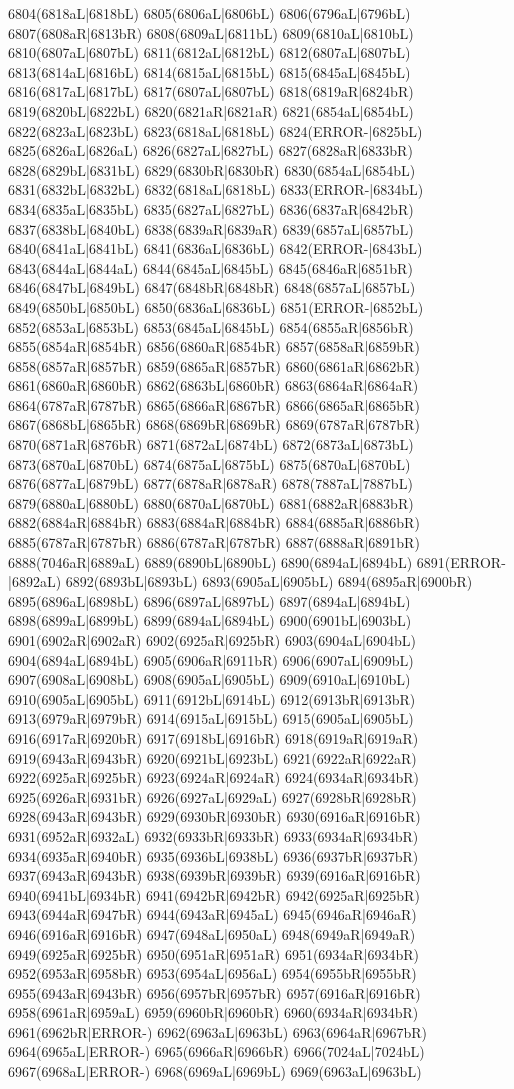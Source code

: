 6804(6818aL|6818bL) 6805(6806aL|6806bL) 6806(6796aL|6796bL) 6807(6808aR|6813bR) 6808(6809aL|6811bL) 6809(6810aL|6810bL) 6810(6807aL|6807bL) 6811(6812aL|6812bL) 6812(6807aL|6807bL) 6813(6814aL|6816bL) 6814(6815aL|6815bL) 6815(6845aL|6845bL) 6816(6817aL|6817bL) 6817(6807aL|6807bL) 6818(6819aR|6824bR) 6819(6820bL|6822bL) 6820(6821aR|6821aR) 6821(6854aL|6854bL) 6822(6823aL|6823bL) 6823(6818aL|6818bL) 6824(ERROR-|6825bL) 6825(6826aL|6826aL) 6826(6827aL|6827bL) 6827(6828aR|6833bR) 6828(6829bL|6831bL) 6829(6830bR|6830bR) 6830(6854aL|6854bL) 6831(6832bL|6832bL) 6832(6818aL|6818bL) 6833(ERROR-|6834bL) 6834(6835aL|6835bL) 6835(6827aL|6827bL) 6836(6837aR|6842bR) 6837(6838bL|6840bL) 6838(6839aR|6839aR) 6839(6857aL|6857bL) 6840(6841aL|6841bL) 6841(6836aL|6836bL) 6842(ERROR-|6843bL) 6843(6844aL|6844aL) 6844(6845aL|6845bL) 6845(6846aR|6851bR) 6846(6847bL|6849bL) 6847(6848bR|6848bR) 6848(6857aL|6857bL) 6849(6850bL|6850bL) 6850(6836aL|6836bL) 6851(ERROR-|6852bL) 6852(6853aL|6853bL) 6853(6845aL|6845bL) 6854(6855aR|6856bR) 6855(6854aR|6854bR) 6856(6860aR|6854bR) 6857(6858aR|6859bR) 6858(6857aR|6857bR) 6859(6865aR|6857bR) 6860(6861aR|6862bR) 6861(6860aR|6860bR) 6862(6863bL|6860bR) 6863(6864aR|6864aR) 6864(6787aR|6787bR) 6865(6866aR|6867bR) 6866(6865aR|6865bR) 6867(6868bL|6865bR) 6868(6869bR|6869bR) 6869(6787aR|6787bR) 6870(6871aR|6876bR) 6871(6872aL|6874bL) 6872(6873aL|6873bL) 6873(6870aL|6870bL) 6874(6875aL|6875bL) 6875(6870aL|6870bL) 6876(6877aL|6879bL) 6877(6878aR|6878aR) 6878(7887aL|7887bL) 6879(6880aL|6880bL) 6880(6870aL|6870bL) 6881(6882aR|6883bR) 6882(6884aR|6884bR) 6883(6884aR|6884bR) 6884(6885aR|6886bR) 6885(6787aR|6787bR) 6886(6787aR|6787bR) 6887(6888aR|6891bR) 6888(7046aR|6889aL) 6889(6890bL|6890bL) 6890(6894aL|6894bL) 6891(ERROR-|6892aL) 6892(6893bL|6893bL) 6893(6905aL|6905bL) 6894(6895aR|6900bR) 6895(6896aL|6898bL) 6896(6897aL|6897bL) 6897(6894aL|6894bL) 6898(6899aL|6899bL) 6899(6894aL|6894bL) 6900(6901bL|6903bL) 6901(6902aR|6902aR) 6902(6925aR|6925bR) 6903(6904aL|6904bL) 6904(6894aL|6894bL) 6905(6906aR|6911bR) 6906(6907aL|6909bL) 6907(6908aL|6908bL) 6908(6905aL|6905bL) 6909(6910aL|6910bL) 6910(6905aL|6905bL) 6911(6912bL|6914bL) 6912(6913bR|6913bR) 6913(6979aR|6979bR) 6914(6915aL|6915bL) 6915(6905aL|6905bL) 6916(6917aR|6920bR) 6917(6918bL|6916bR) 6918(6919aR|6919aR) 6919(6943aR|6943bR) 6920(6921bL|6923bL) 6921(6922aR|6922aR) 6922(6925aR|6925bR) 6923(6924aR|6924aR) 6924(6934aR|6934bR) 6925(6926aR|6931bR) 6926(6927aL|6929aL) 6927(6928bR|6928bR) 6928(6943aR|6943bR) 6929(6930bR|6930bR) 6930(6916aR|6916bR) 6931(6952aR|6932aL) 6932(6933bR|6933bR) 6933(6934aR|6934bR) 6934(6935aR|6940bR) 6935(6936bL|6938bL) 6936(6937bR|6937bR) 6937(6943aR|6943bR) 6938(6939bR|6939bR) 6939(6916aR|6916bR) 6940(6941bL|6934bR) 6941(6942bR|6942bR) 6942(6925aR|6925bR) 6943(6944aR|6947bR) 6944(6943aR|6945aL) 6945(6946aR|6946aR) 6946(6916aR|6916bR) 6947(6948aL|6950aL) 6948(6949aR|6949aR) 6949(6925aR|6925bR) 6950(6951aR|6951aR) 6951(6934aR|6934bR) 6952(6953aR|6958bR) 6953(6954aL|6956aL) 6954(6955bR|6955bR) 6955(6943aR|6943bR) 6956(6957bR|6957bR) 6957(6916aR|6916bR) 6958(6961aR|6959aL) 6959(6960bR|6960bR) 6960(6934aR|6934bR) 6961(6962bR|ERROR-) 6962(6963aL|6963bL) 6963(6964aR|6967bR) 6964(6965aL|ERROR-) 6965(6966aR|6966bR) 6966(7024aL|7024bL) 6967(6968aL|ERROR-) 6968(6969aL|6969bL) 6969(6963aL|6963bL) 